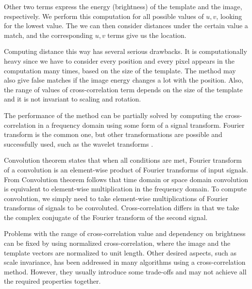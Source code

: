 Other two terms express the energy (brightness) of the template and the image, respectively. We perform this computation for all possible values of $u,v$, looking for the lowest value. The we can then consider distances under  the certain value a match, and the corresponding $u,v$ terms give us the location.

Computing distance this way has several serious drawbacks. It is computationally heavy  since we have to consider every position and every pixel appears in the computation many times, based on the size of the template. The method may also give false matches if the image energy changes a lot with the position. Also, the range of values of cross-correlation term depends on the size of the template and it is not invariant to scaling and rotation. 

The  performance  of the method can be partially solved by computing the cross-correlation in a frequency domain using some form of a signal transform. Fourier transform  is the common one, but other transformations are possible  and successfully used, such as the wavelet transforms \cite{patternRecNN}.

Convolution theorem  states that when all conditions  are met, Fourier transform of a convolution is an element-wise product of Fourier transforms of input signals. From Convolution theorem follows that time domain or space domain convolution is equivalent to element-wise multiplication in the frequency domain. To compute convolution, we simply need to take element-wise multiplications of Fourier transforms of signals to be convoluted. Cross-correlation differs in that we take the complex conjugate of the Fourier transform of the second signal. 

Problems with the range of cross-correlation value and dependency on brightness can be fixed by using normalized cross-correlation, where the image and the template vectors are normalized to unit length. Other desired aspects, such as scale invariance, has been addressed in many algorithms using a cross-correlation method. However, they usually introduce some trade-offs and  may not achieve all the required properties together. 

